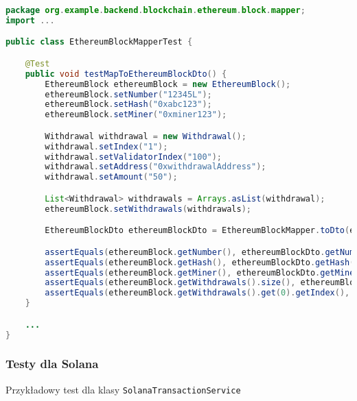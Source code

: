 \begin{lstlisting}[language=Java, style=JavaStyle]
package org.example.backend.blockchain.ethereum.block.mapper;
import ...

public class EthereumBlockMapperTest {

    @Test
    public void testMapToEthereumBlockDto() {
        EthereumBlock ethereumBlock = new EthereumBlock();
        ethereumBlock.setNumber("12345L");
        ethereumBlock.setHash("0xabc123");
        ethereumBlock.setMiner("0xminer123");

        Withdrawal withdrawal = new Withdrawal();
        withdrawal.setIndex("1");
        withdrawal.setValidatorIndex("100");
        withdrawal.setAddress("0xwithdrawalAddress");
        withdrawal.setAmount("50");

        List<Withdrawal> withdrawals = Arrays.asList(withdrawal);
        ethereumBlock.setWithdrawals(withdrawals);

        EthereumBlockDto ethereumBlockDto = EthereumBlockMapper.toDto(ethereumBlock);

        assertEquals(ethereumBlock.getNumber(), ethereumBlockDto.getNumber());
        assertEquals(ethereumBlock.getHash(), ethereumBlockDto.getHash());
        assertEquals(ethereumBlock.getMiner(), ethereumBlockDto.getMiner());
        assertEquals(ethereumBlock.getWithdrawals().size(), ethereumBlockDto.getWithdrawals().size());
        assertEquals(ethereumBlock.getWithdrawals().get(0).getIndex(), ethereumBlockDto.getWithdrawals().get(0).getIndex());
    }

    ...
}
\end{lstlisting}

\subsubsection{Testy dla Solana}

Przykładowy test dla klasy \texttt{SolanaTransactionService}

